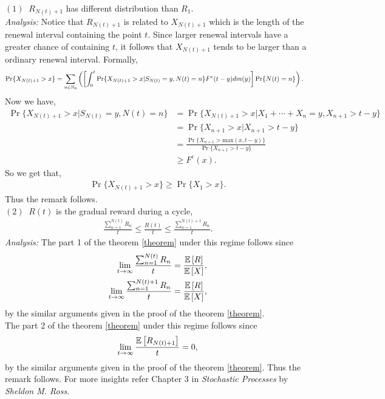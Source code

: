 \documentclass[a4paper,10pt,english]{article}
\begin{document}
\begin{rem}
	 	$ (1) ~$ $R_{N(t)+1}$ has different distribution than $R_1$.\\
	 	\textit{Analysis:} Notice that $R_{N(t)+1}$ is related to $X_{N(t)+1}$ which is the length of the renewal interval containing the point $t$. Since larger renewal intervals have a greater chance of containing $t$, it follows that $X_{N(t)+1}$ tends to be larger than a ordinary renewal interval. Formally,
	 	\begin{align*}
	 		\Pr\{X_{N(t)+1} > x\}&= \sum_{n \in \mathbb{N}_0} \left( \left[ \int_{0}^t\Pr\{X_{N(t)+1} > x | S_{N(t)} = y, N(t)=n\}F^c(t-y)dm(y) \right] \Pr\{N(t)=n\} \right).
	 	\end{align*}
	 	Now we have,
	 	\begin{align*}
	 		\Pr\{X_{N(t)+1}>x | S_{N(t)}=y, N(t)=n\} & = \Pr\{X_{N(t)+1}>x | X_1+\cdots+X_n=y, X_{n+1}>t-y\} \\
	 		& = \Pr\{X_{n+1}>x | X_{n+1}>t-y\} \\
	 		& = \frac{\Pr\{X_{n+1}>\text{max}(x,t-y)\}}{\Pr\{X_{n+1}>t-y\}} \\
	 		& \geq F^c(x). 
	 	\end{align*}
	 	So we get that,
	 	\begin{align*}
	 		\Pr\{X_{N(t)+1}>x\}\geq \Pr\{X_1>x\}.
	 	\end{align*}
	 	Thus the remark follows.\\
	 	$ (2) ~$ $R(t)$ is the gradual reward during a cycle, 
	 	\begin{align*}
	 		\frac{\sum_{n=1}^{N(t)}R_n}{t} \leq  \frac{R(t)}{t} \leq \frac{\sum_{n=1}^{N(t)+1}R_n}{t}.
	 	\end{align*}
	 	\textit{Analysis:} The part 1 of the theorem \ref{theorem} under this regime follows since
	 	\begin{align*}
	 		\lim_{t \to \infty} \frac{\sum_{n=1}^{N(t)}R_n}{t} = \frac{\mathbb{E}\left[R\right]}{\mathbb{E}\left[X\right]},\\
	 		\lim_{t \to \infty} \frac{\sum_{n=1}^{N(t)+1}R_n}{t} = \frac{\mathbb{E}\left[R\right]}{\mathbb{E}\left[X\right]},
	 	\end{align*}
	 	by the similar arguments given in the proof of the theorem \ref{theorem}.\\
	 	The part 2 of the theorem \ref{theorem} under this regime follows since
	 	\begin{align*}
	 		\lim_{t \to \infty} \frac{\mathbb{E}\left[R_{N(t)+1}\right]}{t} = 0,
	 	\end{align*}
	 	by the similar arguments given in the proof of the theorem \ref{theorem}. Thus the remark follows. For more insights refer Chapter 3 in \textit{Stochastic Processes} by \textit{Sheldon M. Ross}.
\end{rem}
\end{document}
